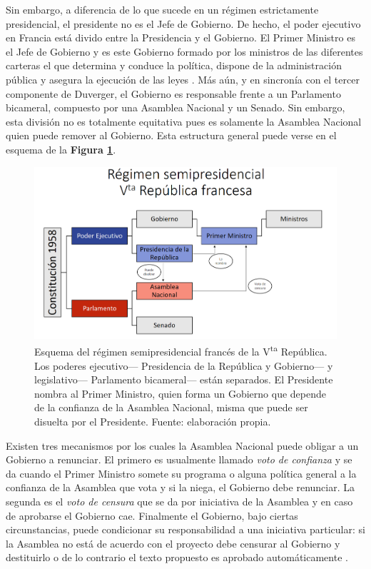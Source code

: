 Sin embargo, a diferencia de lo que sucede en un régimen estrictamente presidencial, el presidente no es el Jefe de Gobierno. De hecho, el poder ejecutivo en Francia está divido entre la Presidencia y el Gobierno. El Primer Ministro es el Jefe de Gobierno y es este Gobierno formado por los ministros de las diferentes carteras el que determina y conduce la política, dispone de la administración pública y asegura la ejecución de las leyes \parencite{ConstFr}. Más aún, y en sincronía con el tercer componente de Duverger, el Gobierno es responsable frente a un Parlamento bicameral, compuesto por una Asamblea Nacional y un Senado. Sin embargo, esta división no es totalmente equitativa pues es solamente la Asamblea Nacional quien puede remover al Gobierno. Esta estructura general puede verse en el esquema de la \textbf{Figura \ref{fig:Regimen_Semipresidencial_VRepFr}}.\\ 

\begin{figure}[h]
	\centering
	\includegraphics[scale=0.25]{Figs/FN_Francia/RegSemiPresFrVta}
	\caption{Esquema del régimen semipresidencial francés de la V\textsuperscript{ta} República. Los poderes ejecutivo--- Presidencia de la República y Gobierno--- y legislativo--- Parlamento bicameral--- están separados. El Presidente nombra al Primer Ministro, quien forma un Gobierno que depende de la confianza de la Asamblea Nacional, misma que puede ser disuelta por el Presidente. Fuente: elaboración propia.}
	\label{fig:Regimen_Semipresidencial_VRepFr}	
\end{figure}

Existen tres mecanismos por los cuales la Asamblea Nacional puede obligar a un Gobierno a renunciar. El primero es usualmente llamado \textit{voto de confianza} y se da cuando el Primer Ministro somete su programa o alguna política general a la confianza de la Asamblea que vota y si la niega, el Gobierno debe renunciar. La segunda es el \textit{voto de censura} que se da por iniciativa de la Asamblea y en caso de aprobarse el Gobierno cae. Finalmente el Gobierno, bajo ciertas circunstancias, puede condicionar su responsabilidad a una iniciativa particular: si la Asamblea no está de acuerdo con el proyecto debe censurar al Gobierno y destituirlo o de lo contrario el texto propuesto es aprobado automáticamente \parencite{AN17c}.\\

